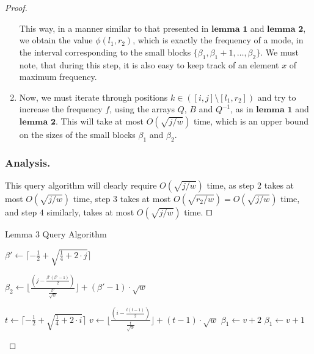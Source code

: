 \documentclass[runningheads]{llncs}
\begin{document}
\begin{proof}
\begin{enumerate}
            This way, in a manner similar to that presented in $\textbf{lemma 1}$ and $\textbf{lemma 2}$, we obtain the value $\phi( l_1, r_2 )$, 
            which is exactly the frequency of a mode, in the interval corresponding to the small blocks $\{\beta_1, \beta_1+1,\dots,\beta_2 \}$. We must note, that during this step, it is also easy 
            to keep track of an element $x$ of maximum frequency.

        \item Now, we must iterate through positions $k \in ( [i,j] \setminus [l_1, r_2] ) $ and try to increase the frequency $f$, using the arrays 
            $Q$, $B$ and $Q^{-1}$, as in $\textbf{lemma 1}$ and $\textbf{lemma 2}$. This will take at most $O(\sqrt{j/w})$ time, which is an upper bound on the sizes of the small blocks $\beta_1$ and $\beta_2$.
        
        

    \end{enumerate}

    \subsubsection{Analysis.}
    This query algorithm will clearly require $O(\sqrt{j/w})$ time, as step 2 takes at most $O(\sqrt{j/w})$ time, step $3$ takes at most $O(\sqrt{ r_2/w } )=O(\sqrt{j/w})$ time, 
    and step $4$ similarly, takes at most $O(\sqrt{j/w})$ time. $\qed$



    \begin{algorithm}[H]
        \caption{Lemma 3 Query Algorithm}\label{lemma3Query}
        \begin{algorithmic}[1]
        

        \State $\beta'\gets \lceil -\frac{1}{2} + \sqrt{ \frac{1}{4} + 2 \cdot j } \rceil$
        
        \State $\beta_2 \gets \lfloor \frac{(j-\frac{ \beta'(\beta'-1) }{2})}{ \frac{\beta'}{\sqrt{w}} } \rfloor + (\beta'-1) \cdot \sqrt{w} $
        
        \State $t \gets \lceil -\frac{1}{2} + \sqrt{ \frac{1}{4} + 2 \cdot i } \rceil$
        \State $v \gets \lfloor \frac{(i-\frac{ t(t-1) }{2})}{ \frac{t}{\sqrt{w}} } \rfloor + (t-1) \cdot \sqrt{w} $
        \State $\beta_1 \gets v+2$
            \State $\beta_1 \gets v+1$
        \EndIf


\end{algorithmic}
\end{algorithm}
\end{proof}
\end{document}
